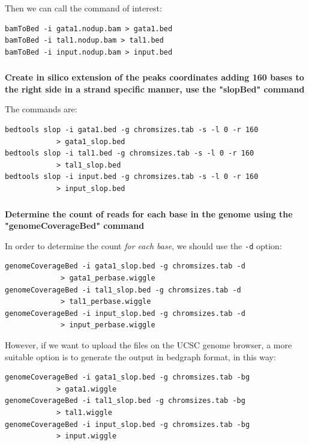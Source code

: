 \documentclass[12pt, a4paper]{article}
\begin{document}
Then we can call the command of interest:

\begin{verbatim}
bamToBed -i gata1.nodup.bam > gata1.bed
bamToBed -i tal1.nodup.bam > tal1.bed
bamToBed -i input.nodup.bam > input.bed
\end{verbatim}

\subsubsection{}
\textbf{Create in silico extension of the peaks coordinates adding 160 bases to the right side in a strand specific manner, use the "slopBed" command}

The commands are:

\begin{verbatim}
bedtools slop -i gata1.bed -g chromsizes.tab -s -l 0 -r 160
            > gata1_slop.bed
bedtools slop -i tal1.bed -g chromsizes.tab -s -l 0 -r 160
            > tal1_slop.bed
bedtools slop -i input.bed -g chromsizes.tab -s -l 0 -r 160
            > input_slop.bed
\end{verbatim}

\subsubsection{}
\textbf{Determine the count of reads for each base in the genome using the "genomeCoverageBed" command}

In order to determine the count \textit{for each base}, we should use the \verb|-d| option:

\begin{verbatim}
genomeCoverageBed -i gata1_slop.bed -g chromsizes.tab -d
             > gata1_perbase.wiggle
genomeCoverageBed -i tal1_slop.bed -g chromsizes.tab -d
             > tal1_perbase.wiggle
genomeCoverageBed -i input_slop.bed -g chromsizes.tab -d
             > input_perbase.wiggle
\end{verbatim}

However, if we want to upload the files on the UCSC genome browser, a more suitable option is to generate the output in bedgraph format, in this way:

\begin{verbatim}
genomeCoverageBed -i gata1_slop.bed -g chromsizes.tab -bg
            > gata1.wiggle
genomeCoverageBed -i tal1_slop.bed -g chromsizes.tab -bg
            > tal1.wiggle
genomeCoverageBed -i input_slop.bed -g chromsizes.tab -bg
            > input.wiggle
\end{verbatim}
\end{document}
